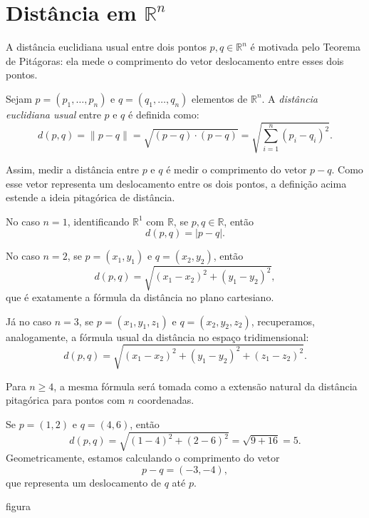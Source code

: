 \section{Distância em \texorpdfstring{$\mathbb R^n$}{Rn}}
A distância euclidiana usual entre dois pontos $p,q\in\mathbb R^n$ é motivada pelo Teorema de Pitágoras:
ela mede o comprimento do vetor deslocamento entre esses dois pontos.

\begin{definition}
    Sejam $p=(p_1,\ldots,p_n)$ e $q=(q_1,\ldots,q_n)$ elementos de $\mathbb R^n$.
    A \emph{distância euclidiana usual} entre $p$ e $q$ é definida como:
    \begin{equation*}
        d(p, q) = \|p-q\| = \sqrt{(p-q) \cdot (p-q)}=\sqrt{\sum_{i=1}^n (p_i - q_i)^2}.
    \end{equation*}
\end{definition}

Assim, medir a distância entre $p$ e $q$ é medir o comprimento do vetor $p-q$.
Como esse vetor representa um deslocamento entre os dois pontos, a definição acima estende a ideia pitagórica de distância.

No caso $n=1$, identificando $\mathbb R^1$ com $\mathbb R$, se $p,q\in\mathbb R$, então
\[
    d(p,q)=|p-q|.
\]

No caso $n=2$, se $p=(x_1,y_1)$ e $q=(x_2,y_2)$, então
\[
    d(p,q)=\sqrt{(x_1-x_2)^2+(y_1-y_2)^2},
\]
que é exatamente a fórmula da distância no plano cartesiano.

Já no caso $n=3$, se $p=(x_1,y_1,z_1)$ e $q=(x_2,y_2,z_2)$, recuperamos, analogamente, a fórmula usual da distância no espaço tridimensional:
\[
    d(p,q)=\sqrt{(x_1-x_2)^2+(y_1-y_2)^2+(z_1-z_2)^2}.
\]

Para $n\geq 4$, a mesma fórmula será tomada como a extensão natural da distância pitagórica para pontos com $n$ coordenadas.

\begin{example}\label{ex:distanciaRn}
    Se $p=(1,2)$ e $q=(4,6)$, então
    \[
        d(p,q)=\sqrt{(1-4)^2+(2-6)^2}
        =\sqrt{9+16}=5.
    \]
    Geometricamente, estamos calculando o comprimento do vetor
    \[
        p-q=(-3,-4),
    \]
    que representa um deslocamento de $q$ até $p$.
\end{example}

{figura}

